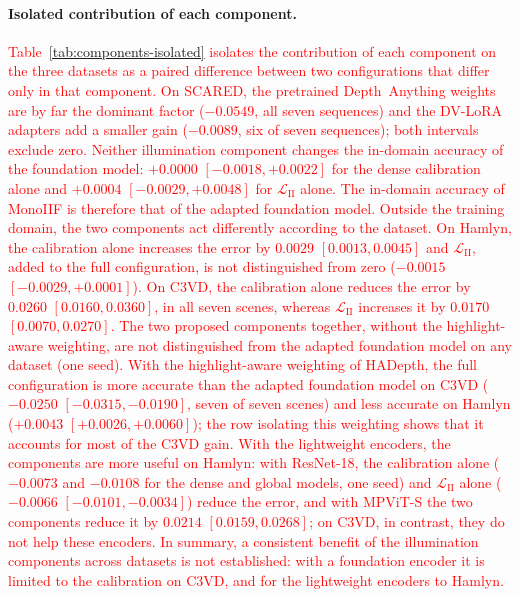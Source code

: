 \documentclass[a4paper,fleqn]{cas-dc}
\begin{document}
{{\paragraph{Isolated contribution of each component.}
\textcolor{red}{Table~\ref{tab:components-isolated} isolates the contribution of each component on the three datasets as a paired difference between two configurations that differ only in that component. On SCARED, the pretrained Depth~Anything weights are by far the dominant factor ($-0.0549$, all seven sequences) and the DV-LoRA adapters add a smaller gain ($-0.0089$, six of seven sequences); both intervals exclude zero. Neither illumination component changes the in-domain accuracy of the foundation model: $+0.0000$ $[-0.0018, +0.0022]$ for the dense calibration alone and $+0.0004$ $[-0.0029, +0.0048]$ for $\mathcal{L}_\textrm{II}$ alone. The in-domain accuracy of MonoIIF is therefore that of the adapted foundation model. Outside the training domain, the two components act differently according to the dataset. On Hamlyn, the calibration alone increases the error by $0.0029$ $[0.0013, 0.0045]$ and $\mathcal{L}_\textrm{II}$, added to the full configuration, is not distinguished from zero ($-0.0015$ $[-0.0029, +0.0001]$). On C3VD, the calibration alone reduces the error by $0.0260$ $[0.0160, 0.0360]$, in all seven scenes, whereas $\mathcal{L}_\textrm{II}$ increases it by $0.0170$ $[0.0070, 0.0270]$. The two proposed components together, without the highlight-aware weighting, are not distinguished from the adapted foundation model on any dataset (one seed). With the highlight-aware weighting of HADepth, the full configuration is more accurate than the adapted foundation model on C3VD ($-0.0250$ $[-0.0315, -0.0190]$, seven of seven scenes) and less accurate on Hamlyn ($+0.0043$ $[+0.0026, +0.0060]$); the row isolating this weighting shows that it accounts for most of the C3VD gain. With the lightweight encoders, the components are more useful on Hamlyn: with ResNet-18, the calibration alone ($-0.0073$ and $-0.0108$ for the dense and global models, one seed) and $\mathcal{L}_\textrm{II}$ alone ($-0.0066$ $[-0.0101, -0.0034]$) reduce the error, and with MPViT-S the two components reduce it by $0.0214$ $[0.0159, 0.0268]$; on C3VD, in contrast, they do not help these encoders. In summary, a consistent benefit of the illumination components across datasets is not established: with a foundation encoder it is limited to the calibration on C3VD, and for the lightweight encoders to Hamlyn.}}
%
\begin{figure}[]
    \centering

\end{figure}}
\end{document}
